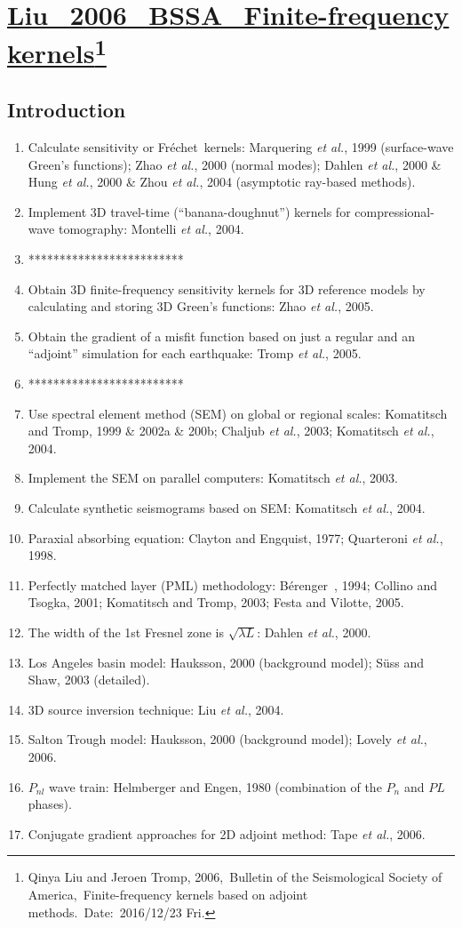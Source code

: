 \documentclass{article}
\newcommand{\Ppath}{/home/tche/Learning/Learning/Paper/}
\newcommand{\prf}{This is relative path from \Papth to the paper file}
\newcommand{\pmk}{This is the brief info.}
\newcommand{\pti}{This is the paper tile}
\newcommand{\pay}{These are authors and year}
\newcommand{\pjo}{This is the journal}
\newcommand{\pda}{This is the date}
\newcommand{\refp}[1]{\href{run:\Ppath\prf}{#1}}
\newcommand{\pinfo}{\refp{\pmk}\footnote{\pay,~\pjo,~\pti.~Date:~\pda}}
\newcommand{\sline}{*************************}
\newcommand{\Frechet}{Fr\'{e}chet~}
\newcommand{\Berenger}{B\'{e}renger~}
\newcommand{\etal}{\textit{et al.}}
\begin{document}
\renewcommand{\pmk}{Liu\_2006\_BSSA\_Finite-frequency kernels}
\renewcommand{\prf}{FWI/\pmk.pdf}
\renewcommand{\pti}{Finite-frequency kernels based on adjoint methods}
\renewcommand{\pay}{Qinya Liu and Jeroen Tromp, 2006}
\renewcommand{\pjo}{Bulletin of the Seismological Society of America}
\renewcommand{\pda}{2016/12/23 Fri.}
\section{\pinfo}
\subsection{Introduction}
\begin{enumerate}[\hspace{10mm}*]
  \item Calculate sensitivity or \Frechet kernels: Marquering \etal, 1999 (surface-wave Green's functions); Zhao \etal, 2000 (normal modes); Dahlen \etal, 2000 \& Hung \etal, 2000 \& Zhou \etal, 2004 (asymptotic ray-based methods).
  \item Implement 3D travel-time (``banana-doughnut'') kernels for compressional-wave tomography: Montelli \etal, 2004.
  \item \sline
  \item Obtain 3D finite-frequency sensitivity kernels for 3D reference models by calculating and storing 3D Green's functions: Zhao \etal, 2005.
  \item Obtain the gradient of a misfit function based on just a regular and an ``adjoint'' simulation for each earthquake: Tromp \etal, 2005.
  \item \sline
  \item Use spectral element method (SEM) on global or regional scales: Komatitsch and Tromp, 1999 \& 2002a \& 200b; Chaljub \etal, 2003; Komatitsch \etal, 2004.
  \item Implement the SEM on parallel computers: Komatitsch \etal, 2003.
  \item Calculate synthetic seismograms based on SEM: Komatitsch \etal, 2004.
  \item Paraxial absorbing equation: Clayton and Engquist, 1977; Quarteroni \etal, 1998.
  \item Perfectly matched layer (PML) methodology: \Berenger, 1994; Collino and Tsogka, 2001; Komatitsch and Tromp, 2003; Festa and Vilotte, 2005.
  \item The width of the 1st Fresnel zone is $\sqrt{\lambda L}$: Dahlen \etal, 2000.
  \item Los Angeles basin model: Hauksson, 2000 (background model); S\"{u}ss and Shaw, 2003 (detailed).
  \item 3D source inversion technique: Liu \etal, 2004.
  \item Salton Trough model: Hauksson, 2000 (background model); Lovely \etal, 2006.
  \item $P_{nl}$ wave train: Helmberger and Engen, 1980 (combination of the $P_n$ and $PL$ phases).
  \item Conjugate gradient approaches for 2D adjoint method: Tape \etal, 2006.
\end{enumerate}\par
\end{document}
